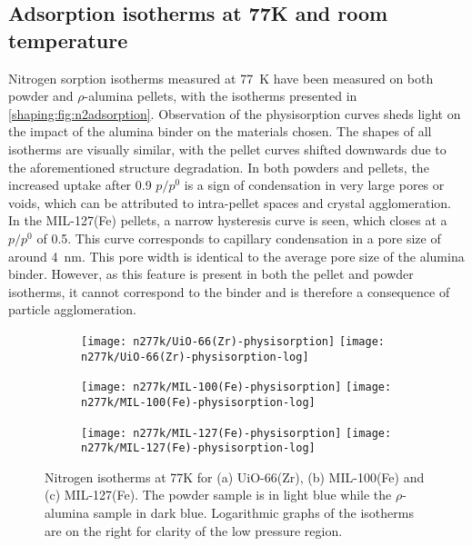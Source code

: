 
\subsection{Adsorption isotherms at 77K and room temperature}

Nitrogen sorption isotherms measured at \SI{77}{\kelvin} have been
measured on both powder and \(\rho\)-alumina pellets, with the isotherms
presented in \autoref{shaping:fig:n2adsorption}.
Observation of the physisorption curves sheds light on the
impact of the alumina binder on the materials chosen.
The shapes of all isotherms are visually similar, with the pellet curves
shifted downwards due to the aforementioned structure degradation.
In both powders and pellets, the increased uptake after 0.9 \(p/p^0\)
is a sign of condensation in very large pores or voids, which can
be attributed to intra-pellet spaces and crystal agglomeration.
In the MIL-127(Fe) pellets, a narrow hysteresis curve is seen,
which closes at a \(p/p^0\) of 0.5. This curve corresponds to
capillary condensation in a pore size of around \SI{4}{\nano\metre}.
This pore width is identical to the average pore size of the alumina
binder. However, as this feature is present in both the pellet and 
powder isotherms, it cannot correspond to the binder and is therefore
a consequence of particle agglomeration.

\begin{figure}[p!]
	\centering

	\begin{subfigure}{\linewidth}
		\centering
		\parbox[c]{0.1\linewidth}{\caption{}\label{shaping:fig:n277kuio66}}%
		\texttt{[image: n277k/UiO-66(Zr)-physisorption]}%
		\texttt{[image: n277k/UiO-66(Zr)-physisorption-log]}%
	\end{subfigure}%

	\begin{subfigure}{\linewidth}
		\centering
		\parbox[c]{0.1\linewidth}{\caption{}\label{shaping:fig:n277kmil100}}%
		\texttt{[image: n277k/MIL-100(Fe)-physisorption]}%
		\texttt{[image: n277k/MIL-100(Fe)-physisorption-log]}%
	\end{subfigure}%

	\begin{subfigure}{\linewidth}
		\centering
		\parbox[c]{0.1\linewidth}{\caption{}\label{shaping:fig:n277kmil127}}%
		\texttt{[image: n277k/MIL-127(Fe)-physisorption]}%
		\texttt{[image: n277k/MIL-127(Fe)-physisorption-log]}%
	\end{subfigure}%

	\caption{Nitrogen isotherms at 77K for (a) UiO-66(Zr),
		(b) MIL-100(Fe) and (c) MIL-127(Fe). The powder sample is in light
		blue while the \(\rho\)-alumina sample in dark blue. Logarithmic
		graphs of the isotherms are on the right for clarity of the low
		pressure region.}%
	\label{shaping:fig:n2adsorption}
\end{figure}

